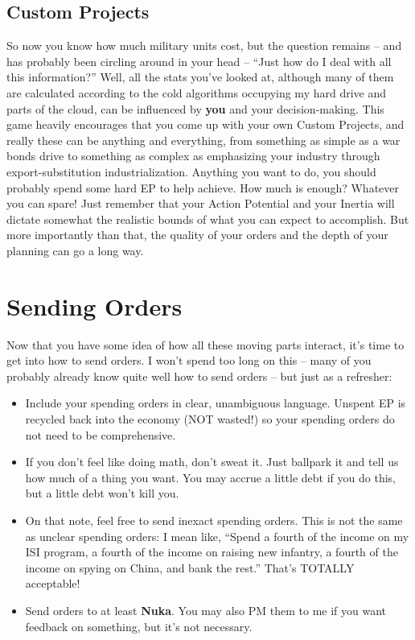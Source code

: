 \documentclass[11 pt]{scrartcl}
\begin{document}
\subsection{Custom Projects}

So now you know how much military units cost, but the question remains -- and has probably been circling around in your head -- ``Just how do I deal with all this information?'' Well, all the stats you've looked at, although many of them are calculated according to the cold algorithms occupying my hard drive and parts of the cloud, can be influenced by \textbf{you} and your decision-making. This game heavily encourages that you come up with your own Custom Projects, and really these can be anything and everything, from something as simple as a war bonds drive to something as complex as emphasizing your industry through export-substitution industrialization. Anything you want to do, you should probably spend some hard EP to help achieve. How much is enough? Whatever you can spare! Just remember that your Action Potential and your Inertia will dictate somewhat the realistic bounds of what you can expect to accomplish. But more importantly than that, the quality of your orders and the depth of your planning can go a long way.

\section{Sending Orders}

Now that you have some idea of how all these moving parts interact, it's time to get into how to send orders. I won't spend too long on this -- many of you probably already know quite well how to send orders -- but just as a refresher:

\begin{itemize}
\item Include your spending orders in clear, unambiguous language. Unspent EP is recycled back into the economy (NOT wasted!) so your spending orders do not need to be comprehensive.
\item If you don't feel like doing math, don't sweat it. Just ballpark it and tell us how much of a thing you want. You may accrue a little debt if you do this, but a little debt won't kill you.
\item On that note, feel free to send inexact spending orders. This is not the same as unclear spending orders: I mean like, ``Spend a fourth of the income on my ISI program, a fourth of the income on raising new infantry, a fourth of the income on spying on China, and bank the rest.'' That's TOTALLY acceptable!
\item Send orders to at least \textbf{Nuka}. You may also PM them to me if you want feedback on something, but it's not necessary.
\end{itemize}
\end{document}
